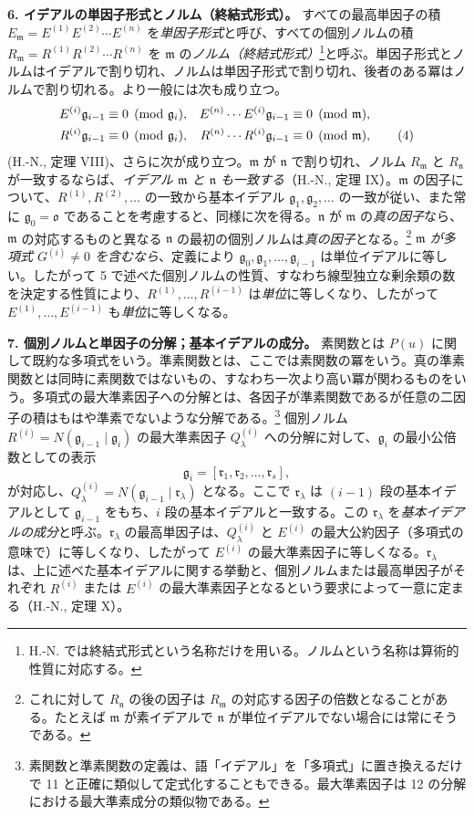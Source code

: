 \documentclass[11pt]{article}
\providecommand{\frakm}{\mathfrak m}
\providecommand{\frakn}{\mathfrak n}
\providecommand{\frakr}{\mathfrak r}
\providecommand{\frakg}{\mathfrak g}
\providecommand{\frako}{\mathfrak o}
\providecommand{\frako}{\mathfrak o}
\begin{document}
\textbf{6. イデアルの単因子形式とノルム（終結式形式）。} すべての最高単因子の積 $E_\frakm=E^{(1)}E^{(2)}\cdots E^{(n)}$ を\emph{単因子形式}と呼び、すべての個別ノルムの積 $R_\frakm=R^{(1)}R^{(2)}\cdots R^{(n)}$ を $\frakm$ の\emph{ノルム（終結式形式）}\footnote{H.-N. では終結式形式という名称だけを用いる。ノルムという名称は算術的性質に対応する。}と呼ぶ。単因子形式とノルムはイデアルで割り切れ、ノルムは単因子形式で割り切れ、後者のある冪はノルムで割り切れる。より一般には次も成り立つ。
\begin{align}
 E^{(i)}\frakg_{i-1}&\equiv0\pmod{\frakg_i},
& E^{(n)}\cdots E^{(i)}\frakg_{i-1}&\equiv0\pmod{\frakm},\notag\\
 R^{(i)}\frakg_{i-1}&\equiv0\pmod{\frakg_i},
& R^{(n)}\cdots R^{(i)}\frakg_{i-1}&\equiv0\pmod{\frakm}, \tag{4}
\end{align}
(H.-N., 定理 VIII)、さらに次が成り立つ。$\frakm$ が $\frakn$ で割り切れ、ノルム $R_\frakm$ と $R_\frakn$ が一致するならば、\emph{イデアル $\frakm$ と $\frakn$ も一致する}（H.-N., 定理 IX）。$\frakm$ の因子について、$R^{(1)},R^{(2)},\ldots$ の一致から基本イデアル $\frakg_1,\frakg_2,\ldots$ の一致が従い、また常に $\frakg_0=\frako$ であることを考慮すると、同様に次を得る。$\frakn$ が $\frakm$ の\emph{真の因子}なら、$\frakm$ の対応するものと異なる $\frakn$ の最初の個別ノルムは\emph{真の因子}となる。\footnote{これに対して $R_\frakn$ の後の因子は $R_\frakm$ の対応する因子の倍数となることがある。たとえば $\frakm$ が素イデアルで $\frakn$ が単位イデアルでない場合には常にそうである。} \emph{$\frakm$ が多項式 $G^{(i)}\ne0$ を含むなら}、定義により $\frakg_0,\frakg_1,\ldots,\frakg_{i-1}$ は単位イデアルに等しい。したがって 5 で述べた個別ノルムの性質、すなわち線型独立な剰余類の数を決定する性質により、$R^{(1)},\ldots,R^{(i-1)}$ は\emph{単位}に等しくなり、したがって $E^{(1)},\ldots,E^{(i-1)}$ も\emph{単位}に等しくなる。

\textbf{7. 個別ノルムと単因子の分解；基本イデアルの成分。} 素関数とは $P(u)$ に関して既約な多項式をいう。準素関数とは、ここでは素関数の冪をいう。真の準素関数とは同時に素関数ではないもの、すなわち一次より高い冪が関わるものをいう。多項式の最大準素因子への分解とは、各因子が準素関数であるが任意の二因子の積はもはや準素でないような分解である。\footnote{素関数と準素関数の定義は、語「イデアル」を「多項式」に置き換えるだけで 11 と正確に類似して定式化することもできる。最大準素因子は 12 の分解における最大準素成分の類似物である。} 個別ノルム $R^{(i)}=N(\frakg_{i-1}\mid\frakg_i)$ の最大準素因子 $Q_\lambda^{(i)}$ への分解に対して、$\frakg_i$ の最小公倍数としての表示
\[
 \frakg_i=[\frakr_1,\frakr_2,\ldots,\frakr_s],
\]
が対応し、$Q_\lambda^{(i)}=N(\frakg_{i-1}\mid\frakr_\lambda)$ となる。ここで $\frakr_\lambda$ は $(i-1)$ 段の基本イデアルとして $\frakg_{i-1}$ をもち、$i$ 段の基本イデアルと一致する。この $\frakr_\lambda$ を\emph{基本イデアルの成分}と呼ぶ。$\frakr_\lambda$ の最高単因子は、$Q_\lambda^{(i)}$ と $E^{(i)}$ の最大公約因子（多項式の意味で）に等しくなり、したがって $E^{(i)}$ の最大準素因子に等しくなる。$\frakr_\lambda$ は、上に述べた基本イデアルに関する挙動と、個別ノルムまたは最高単因子がそれぞれ $R^{(i)}$ または $E^{(i)}$ の最大準素因子となるという要求によって一意に定まる（H.-N., 定理 X）。
\end{document}
